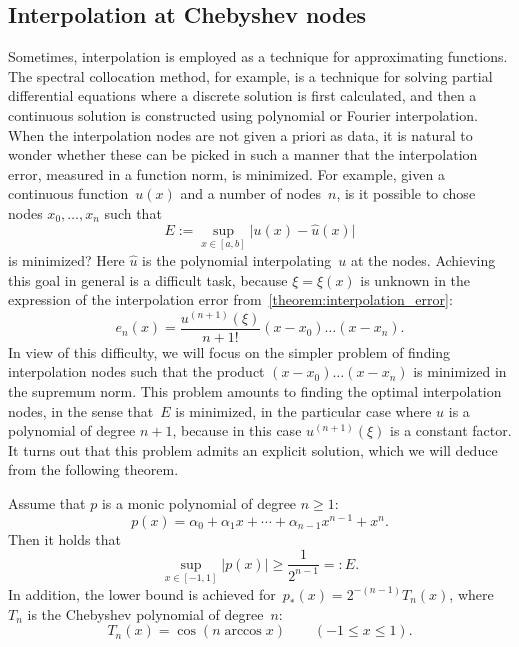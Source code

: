 \subsection{Interpolation at Chebyshev nodes}
Sometimes,
interpolation is employed as a technique for approximating functions.
The spectral collocation method, for example,
is a technique for solving partial differential equations
where a discrete solution is first calculated,
and then a continuous solution is constructed using polynomial or Fourier interpolation.
When the interpolation nodes are not given a priori as data,
it is natural to wonder whether these can be picked in such a manner that the interpolation error,
measured in a function norm, is minimized.
For example, given a continuous function~$u(x)$ and a number of nodes~$n$,
is it possible to chose nodes $x_0, \dotsc, x_n$ such that
\[
    E := \sup_{x \in [a, b]} \bigl\lvert u(x) - \widehat u(x) \bigr\rvert
\]
is minimized?
Here $\widehat u$ is the polynomial interpolating~$u$ at the nodes.
Achieving this goal in general is a difficult task,
because $\xi = \xi(x)$ is unknown in the expression of the interpolation error from~\cref{theorem:interpolation_error}:
\[
    e_n(x) = \frac{u^{(n+1)}(\xi)}{n+1!} (x-x_0) \dotsc (x - x_n).
\]
In view of this difficulty,
we will focus on the simpler problem of finding interpolation nodes
such that the product $(x-x_0) \dotsc (x - x_n)$ is minimized in the supremum norm.
This problem amounts to finding the optimal interpolation nodes,
in the sense that~$E$ is minimized,
in the particular case where $u$ is a polynomial of degree $n+1$,
because in this case $u^{(n+1)}(\xi)$ is a constant factor.
It turns out that this problem admits an explicit solution,
which we will deduce from the following theorem.
\begin{theorem}
    \label{theorem:minimum_infty_norm}
    Assume that $p$ is a monic polynomial of degree $n \geq 1$:
    \[
        p(x) = \alpha_0 + \alpha_1 x + \dotsb + \alpha_{n-1} x^{n-1} +  x^n.
    \]
    Then it holds that
    \begin{equation}
        \label{eq:chebychev_lower_bound}
        \sup_{x \in [-1, 1]} \bigl\lvert p(x) \bigr\rvert \geq \frac{1}{2^{n-1}} =: E.
    \end{equation}
    In addition, the lower bound is achieved for~$p_*(x) = 2^{-(n-1)} T_n(x)$,
    where $T_n$ is the Chebyshev polynomial of degree~$n$:
    \begin{equation}
        \label{eq:chebyshev_polynomial}
        T_n(x) = \cos(n\arccos x) \qquad (-1 \leq x \leq 1).
    \end{equation}
\end{theorem}
